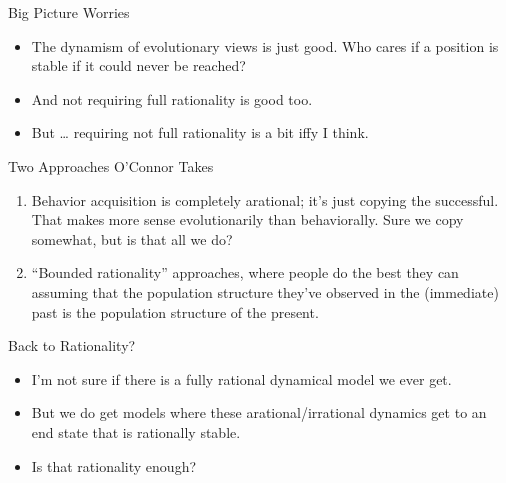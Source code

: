 \documentclass[
  ignorenonframetext,
]{beamer}
\providecommand{\tightlist}{%
  \setlength{\itemsep}{0pt}\setlength{\parskip}{0pt}}
\begin{document}
\begin{frame}{Big Picture Worries}
\protect\hypertarget{big-picture-worries}{}
\begin{itemize}[<+->]
\tightlist
\item
  The dynamism of evolutionary views is just good. Who cares if a
  position is stable if it could never be reached?
\item
  And not requiring full rationality is good too.
\item
  But \ldots{} requiring not full rationality is a bit iffy I think.
\end{itemize}
\end{frame}

\begin{frame}{Two Approaches O'Connor Takes}
\protect\hypertarget{two-approaches-oconnor-takes}{}
\begin{enumerate}[<+->]
\tightlist
\item
  Behavior acquisition is completely arational; it's just copying the
  successful. That makes more sense evolutionarily than behaviorally.
  Sure we copy somewhat, but is that all we do?
\item
  ``Bounded rationality'' approaches, where people do the best they can
  assuming that the population structure they've observed in the
  (immediate) past is the population structure of the present.
\end{enumerate}
\end{frame}

\begin{frame}{Back to Rationality?}
\protect\hypertarget{back-to-rationality}{}
\begin{itemize}
\tightlist
\item
  I'm not sure if there is a fully rational dynamical model we ever get.
\item
  But we do get models where these arational/irrational dynamics get to
  an end state that is rationally stable.
\item
  Is that rationality enough?
\end{itemize}
\end{frame}
\end{document}
